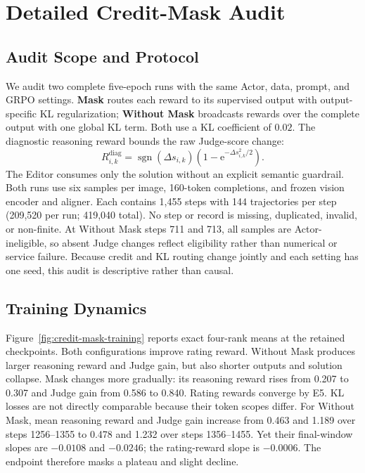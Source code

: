 \section{Detailed Credit-Mask Audit}
\label{app:credit-mask-audit}

\subsection{Audit Scope and Protocol}
We audit two complete five-epoch runs with the same Actor, data, prompt, and
GRPO settings. \textbf{Mask} routes each reward to its supervised output with
output-specific KL regularization; \textbf{Without Mask} broadcasts rewards
over the complete output with one global KL term. Both use a KL coefficient of
$0.02$. The diagnostic reasoning reward bounds the raw Judge-score change:
\begin{equation}
    R_{i,k}^{\mathrm{diag}}
    =\operatorname{sgn}(\Delta s_{i,k})
    \left(1-\mathrm{e}^{-\Delta s_{i,k}^{2}/2}\right).
    \label{eq:diagnostic-reasoning-reward}
\end{equation}
The Editor consumes only the solution without an explicit semantic guardrail.
Both runs use six samples per image, 160-token completions, and frozen vision
encoder and aligner. Each contains 1,455 steps with 144 trajectories per step
(209,520 per run; 419,040 total). No step or record is missing, duplicated,
invalid, or non-finite. At Without Mask steps 711 and 713, all samples are
Actor-ineligible, so absent Judge changes reflect eligibility rather than
numerical or service failure. Because credit and KL routing change jointly and
each setting has one seed, this audit is descriptive rather than causal.

\subsection{Training Dynamics}
Figure~\ref{fig:credit-mask-training} reports exact four-rank means at the
retained checkpoints. Both configurations improve rating reward. Without Mask
produces larger reasoning reward and Judge gain, but also shorter outputs and
solution collapse. Mask changes more gradually: its reasoning reward rises
from 0.207 to 0.307 and Judge gain from 0.586 to 0.840. Rating rewards converge
by E5. KL losses are not directly comparable because their token scopes differ.
For Without Mask, mean reasoning reward and Judge gain increase from 0.463 and
1.189 over steps 1256--1355 to 0.478 and 1.232 over steps 1356--1455. Yet their
final-window slopes are $-0.0108$ and $-0.0246$; the rating-reward slope is
$-0.0006$. The endpoint therefore masks a plateau and slight decline.

